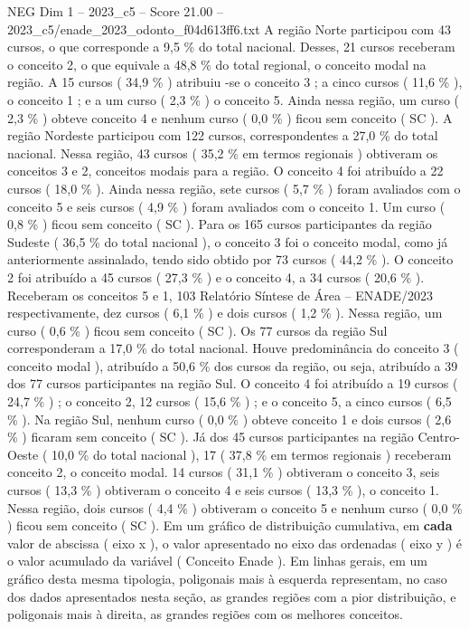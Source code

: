 \begin{textsample}{NEG Dim 1 – 2023\_c5 – Score 21.00 – 2023\_c5/enade\_2023\_odonto\_f04d613ff6.txt}
A região Norte participou com 43 cursos, o que corresponde a 9,5 \% do total nacional.
Desses, 21 cursos receberam o conceito 2, o que equivale a 48,8 \% do total regional, o conceito modal na região.
A 15 cursos ( 34,9 \% ) atribuiu -se o conceito 3 ; a cinco cursos ( 11,6 \% ), o conceito 1 ; e a um curso ( 2,3 \% ) o conceito 5.
Ainda nessa região, um curso ( 2,3 \% ) obteve conceito 4 e nenhum curso ( 0,0 \% ) ficou sem conceito ( SC ).
A região Nordeste participou com 122 cursos, correspondentes a 27,0 \% do total nacional.
Nessa região, 43 cursos ( 35,2 \% em termos regionais ) obtiveram os conceitos 3 e 2, conceitos modais para a região.
O conceito 4 foi atribuído a 22 cursos ( 18,0 \% ).
Ainda nessa região, sete cursos ( 5,7 \% ) foram avaliados com o conceito 5 e seis cursos ( 4,9 \% ) foram avaliados com o conceito 1.
Um curso ( 0,8 \% ) ficou sem conceito ( SC ).
Para os 165 cursos participantes da região Sudeste ( 36,5 \% do total nacional ), o conceito 3 foi o conceito modal, como já anteriormente assinalado, tendo sido obtido por 73 cursos ( 44,2 \% ).
O conceito 2 foi atribuído a 45 cursos ( 27,3 \% ) e o conceito 4, a 34 cursos ( 20,6 \% ).
Receberam os conceitos 5 e 1, 103 Relatório Síntese de Área – ENADE/2023 respectivamente, dez cursos ( 6,1 \% ) e dois cursos ( 1,2 \% ).
Nessa região, um curso ( 0,6 \% ) ficou sem conceito ( SC ).
Os 77 cursos da região Sul corresponderam a 17,0 \% do total nacional.
Houve predominância do conceito 3 ( conceito modal ), atribuído a 50,6 \% dos cursos da região, ou seja, atribuído a 39 dos 77 cursos participantes na região Sul.
O conceito 4 foi atribuído a 19 cursos ( 24,7 \% ) ; o conceito 2, 12 cursos ( 15,6 \% ) ; e o conceito 5, a cinco cursos ( 6,5 \% ).
Na região Sul, nenhum curso ( 0,0 \% ) obteve conceito 1 e dois cursos ( 2,6 \% ) ficaram sem conceito ( SC ).
Já dos 45 cursos participantes na região Centro-Oeste ( 10,0 \% do total nacional ), 17 ( 37,8 \% em termos regionais ) receberam conceito 2, o conceito modal. 14 cursos ( 31,1 \% ) obtiveram o conceito 3, seis cursos ( 13,3 \% ) obtiveram o conceito 4 e seis cursos ( 13,3 \% ), o conceito 1.
Nessa região, dois cursos ( 4,4 \% ) obtiveram o conceito 5 e nenhum curso ( 0,0 \% ) ficou sem conceito ( SC ).
Em um gráfico de distribuição cumulativa, em \textbf{cada} valor de abscissa ( eixo x ), o valor apresentado no eixo das ordenadas ( eixo y ) é o valor acumulado da variável ( Conceito Enade ).
Em linhas gerais, em um gráfico desta mesma tipologia, poligonais mais à esquerda representam, no caso dos dados apresentados nesta seção, as grandes regiões com a pior distribuição, e poligonais mais à direita, as grandes regiões com os melhores conceitos.

\end{textsample}
